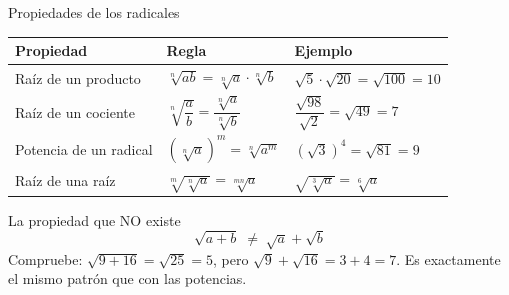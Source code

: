 \documentclass[aspectratio=169,10pt]{beamer}
\begin{document}
\begin{frame}{Propiedades de los radicales}
  \scriptsize
  \begin{center}
  \begin{tabular}{@{}p{4.2cm}p{3.8cm}p{4.0cm}@{}}
    \toprule
    \textbf{Propiedad} & \textbf{Regla} & \textbf{Ejemplo} \\
    \midrule
    Raíz de un producto &
      $\sqrt[n]{ab} = \sqrt[n]{a}\cdot\sqrt[n]{b}$ &
      $\sqrt{5}\cdot\sqrt{20} = \sqrt{100} = 10$ \\
    \addlinespace
    Raíz de un cociente &
      $\sqrt[n]{\dfrac{a}{b}}
       = \dfrac{\sqrt[n]{a}}{\sqrt[n]{b}}$ &
      $\dfrac{\sqrt{98}}{\sqrt{2}} = \sqrt{49} = 7$ \\
    \addlinespace
    Potencia de un radical &
      $\left(\sqrt[n]{a}\right)^{m} = \sqrt[n]{a^{m}}$ &
      $(\sqrt{3})^{4} = \sqrt{81} = 9$ \\
    \addlinespace
    Raíz de una raíz &
      $\sqrt[m]{\sqrt[n]{a}} = \sqrt[mn]{a}$ &
      $\sqrt{\sqrt[3]{a}} = \sqrt[6]{a}$ \\
    \bottomrule
  \end{tabular}
  \end{center}

  \vspace{0.1cm}
  \begin{alertblock}{La propiedad que NO existe}
    \tiny
    \[ \sqrt{a+b} \;\neq\; \sqrt{a}+\sqrt{b} \]
    Compruebe: $\sqrt{9+16}=\sqrt{25}=5$, pero $\sqrt{9}+\sqrt{16}=3+4=7$.
    Es exactamente el mismo patrón que con las potencias.
  \end{alertblock}
\end{frame}
\end{document}
